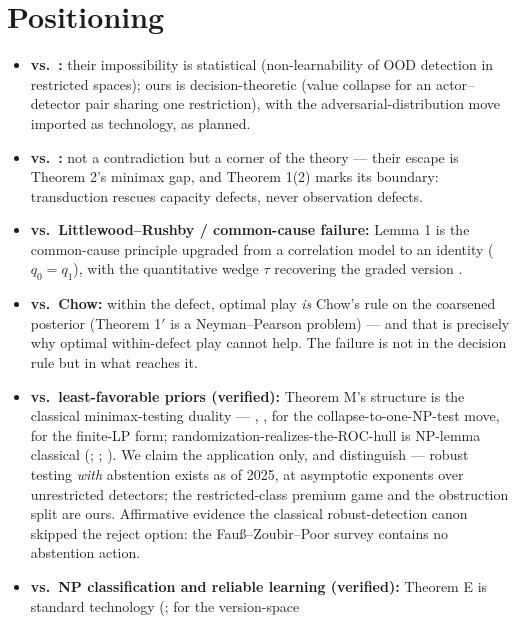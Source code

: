 \documentclass[11pt]{article}
\theoremstyle{plain}
\theoremstyle{definition}
\begin{document}
\section{Positioning}\label{app:positioning}

\begin{itemize}
\item \textbf{vs.\ \citet{fang2022}:} their impossibility is statistical
  (non-learnability of OOD detection in restricted spaces); ours is
  decision-theoretic (value collapse for an actor--detector pair sharing one
  restriction), with the adversarial-distribution move imported as
  technology, as planned.
\item \textbf{vs.\ \citet{goldwasser2020}:} not a contradiction but a corner of the
  theory --- their escape is Theorem 2's minimax gap, and Theorem 1(2) marks
  its boundary: transduction rescues capacity defects, never observation
  defects.
\item \textbf{vs.\ Littlewood--Rushby / common-cause failure:} Lemma 1 is the
  common-cause principle upgraded from a correlation model to an identity
  ($q_0 = q_1$), with the quantitative wedge $\tau$ recovering the graded
  version \citep{littlewood2012}.
\item \textbf{vs.\ Chow:} within the defect, optimal play \emph{is} Chow's rule on the
  coarsened posterior (Theorem 1$'$ is a Neyman--Pearson problem) --- and that is
  precisely why optimal within-defect play cannot help. The failure is not in
  the decision rule but in what reaches it.
\item \textbf{vs.\ least-favorable priors (verified):} Theorem M's structure is the
  classical minimax-testing duality --- \citet{wald1945,wald1950}, \citet{huber1965},
  \citet{huberstrassen1973} for the collapse-to-one-NP-test move, \citet{fillatre2017}
  for the finite-LP form; randomization-realizes-the-ROC-hull is
  NP-lemma classical (\citealt[Thm 3.2.1]{lehmannromano2005}; \citealt{provost2001};
  \citealt[\S V-D]{fauss2021}). We claim the application only, and distinguish
  \citet{managoli2025} --- robust testing \emph{with} abstention
  exists as of 2025, at asymptotic exponents over unrestricted detectors;
  the restricted-class premium game and the obstruction split are ours.
  Affirmative evidence the classical robust-detection canon skipped the
  reject option: the Fau\ss--Zoubir--Poor survey contains no abstention action.
\item \textbf{vs.\ NP classification and reliable learning (verified):} Theorem E is
  standard technology (\citealt{vapnik1971}; \citealt[Thm 2.1]{blumer1989} for the version-space

\end{itemize}
\end{document}
